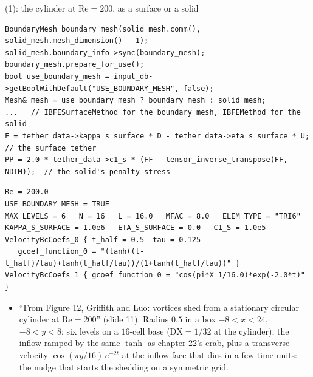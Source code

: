\documentclass[aspectratio=169,11pt]{beamer}
\begin{document}
\begin{frame}[fragile]{ (1): the cylinder at $\mathrm{Re} = 200$, as a surface or a solid}
\label{fr:ex5}
\footnotesize
\begin{lstlisting}[style=cpptiny]
BoundaryMesh boundary_mesh(solid_mesh.comm(), solid_mesh.mesh_dimension() - 1);
solid_mesh.boundary_info->sync(boundary_mesh);
boundary_mesh.prepare_for_use();
bool use_boundary_mesh = input_db->getBoolWithDefault("USE_BOUNDARY_MESH", false);
Mesh& mesh = use_boundary_mesh ? boundary_mesh : solid_mesh;
...   // IBFESurfaceMethod for the boundary mesh, IBFEMethod for the solid
F = tether_data->kappa_s_surface * D - tether_data->eta_s_surface * U;   // the surface tether
PP = 2.0 * tether_data->c1_s * (FF - tensor_inverse_transpose(FF, NDIM));  // the solid's penalty stress
\end{lstlisting}
\begin{lstlisting}[style=inputtiny]
Re = 200.0
USE_BOUNDARY_MESH = TRUE
MAX_LEVELS = 6   N = 16   L = 16.0   MFAC = 8.0   ELEM_TYPE = "TRI6"
KAPPA_S_SURFACE = 1.0e6   ETA_S_SURFACE = 0.0   C1_S = 1.0e5
VelocityBcCoefs_0 { t_half = 0.5  tau = 0.125
   gcoef_function_0 = "(tanh((t-t_half)/tau)+tanh(t_half/tau))/(1+tanh(t_half/tau))" }
VelocityBcCoefs_1 { gcoef_function_0 = "cos(pi*X_1/16.0)*exp(-2.0*t)" }
\end{lstlisting}
\begin{itemize}
  \item ``From Figure 12, Griffith and Luo: vortices shed from a stationary circular cylinder at $\mathrm{Re} = 200$'' (slide 11). Radius $0.5$ in a box $-8 < x < 24$, $-8 < y < 8$; six levels on a $16$-cell base ($\mathrm{DX} = 1/32$ at the cylinder); the inflow ramped by the same $\tanh$ as chapter 22's crab, plus a transverse velocity $\cos(\pi y/16)\,e^{-2t}$ at the inflow face that dies in a few time units: the nudge that starts the shedding on a symmetric grid.
\end{itemize}
\end{frame}
\end{document}
